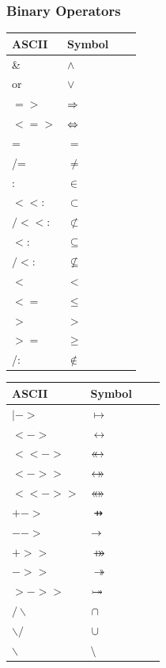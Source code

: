 \subsubsection{Binary Operators}

\begin{center}
    \begin{tabular}{ | l | l | l | p{5cm} |}
    \hline
	ASCII & Symbol \\ \hline
	\& & $\land$ \\ \hline
	or & $\lor$ \\ \hline
	$=>$ & $\mathbin\Rightarrow$ \\ \hline
	$<=>$ & $\mathbin\Leftrightarrow$ \\ \hline
	= & $=$ \\ \hline
	/= & $\neq$ \\ \hline
	: & $\in$ \\ \hline
	$<<:$ & $\subset$ \\ \hline
	$/<<:$ & $\not\subset$ \\ \hline
	$<:$ & $\subseteq$ \\ \hline
	$/<$: & $\not\subseteq$ \\ \hline
	$<$ & $<$ \\ \hline
	$<=$ & $\leq$ \\ \hline
	$>$ & $>$ \\ \hline
	$>=$ & $\geq$ \\ \hline
	/: & $\notin$ \\ \hline
    \end{tabular}
    \begin{tabular}{ | l | l | l | p{5cm} |}
    \hline
	ASCII & Symbol \\ \hline
	$|->$ & $\mapsto$ \\ \hline
	$<->$ & $\rel$ \\ \hline
	$<<->$ & $\mathbin{\leftarrow\mkern-14mu\leftrightarrow}$ \\ \hline
	$<->>$ & $\mathbin{\leftrightarrow\mkern-14mu\rightarrow}$ \\ \hline
	$<<->>$ & $\mathbin{\leftrightarrow\mkern-14mu\leftrightarrow}$ \\ \hline
	$+->$ & $\pfun$ \\ \hline
	$-->$ & $\mathbin\rightarrow$ \\ \hline
	$+>>$ & $\psur$ \\ \hline
	$->>$ & $\tsur$ \\ \hline
	$>->>$ & $\mathbin{ \rightarrowtail \mkern-18mu\twoheadrightarrow}$ \\ \hline
	$/\backslash$ & $\mathbin{\mkern1mu\cap\mkern1mu}$ \\ \hline
	$\backslash/$ & $\mathbin{\mkern1mu\cup\mkern1mu}$ \\ \hline
	$\backslash$ & $\setminus$ \\ \hline

\end{tabular}
\end{center}
